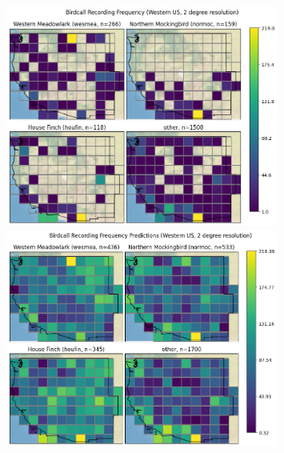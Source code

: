 \documentclass[notitlepage]{article}
\begin{document}
\begin{figure}[ht!]
\centering
\includegraphics[width=0.8\textwidth]{report/figures/western_us_raw_4.png}
\includegraphics[width=0.8\textwidth]{report/figures/western_us_predict_4.png}
\end{figure}
\end{document}
